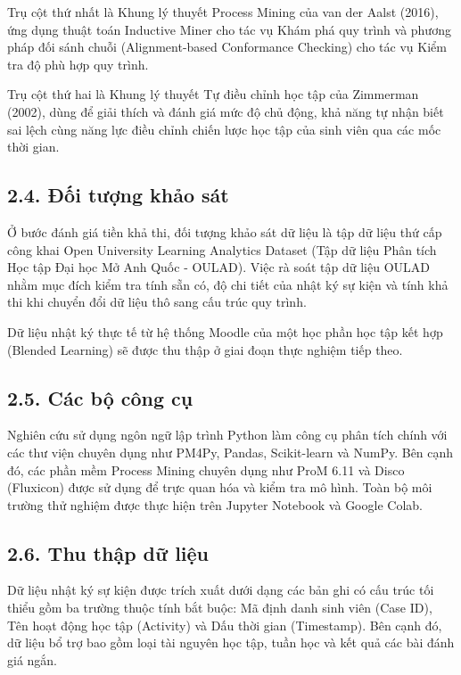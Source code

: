 Trụ cột thứ nhất là Khung lý thuyết Process Mining của van der Aalst (2016), ứng dụng thuật toán Inductive Miner cho tác vụ Khám phá quy trình và phương pháp đối sánh chuỗi (Alignment-based Conformance Checking) cho tác vụ Kiểm tra độ phù hợp quy trình.

Trụ cột thứ hai là Khung lý thuyết Tự điều chỉnh học tập của Zimmerman (2002), dùng để giải thích và đánh giá mức độ chủ động, khả năng tự nhận biết sai lệch cùng năng lực điều chỉnh chiến lược học tập của sinh viên qua các mốc thời gian.

\subsection{2.4. Đối tượng khảo sát}
Ở bước đánh giá tiền khả thi, đối tượng khảo sát dữ liệu là tập dữ liệu thứ cấp công khai Open University Learning Analytics Dataset (Tập dữ liệu Phân tích Học tập Đại học Mở Anh Quốc - OULAD). Việc rà soát tập dữ liệu OULAD nhằm mục đích kiểm tra tính sẵn có, độ chi tiết của nhật ký sự kiện và tính khả thi khi chuyển đổi dữ liệu thô sang cấu trúc quy trình.

Dữ liệu nhật ký thực tế từ hệ thống Moodle của một học phần học tập kết hợp (Blended Learning) sẽ được thu thập ở giai đoạn thực nghiệm tiếp theo.

\subsection{2.5. Các bộ công cụ}
Nghiên cứu sử dụng ngôn ngữ lập trình Python làm công cụ phân tích chính với các thư viện chuyên dụng như PM4Py, Pandas, Scikit-learn và NumPy. Bên cạnh đó, các phần mềm Process Mining chuyên dụng như ProM 6.11 và Disco (Fluxicon) được sử dụng để trực quan hóa và kiểm tra mô hình. Toàn bộ môi trường thử nghiệm được thực hiện trên Jupyter Notebook và Google Colab.

\subsection{2.6. Thu thập dữ liệu}
Dữ liệu nhật ký sự kiện được trích xuất dưới dạng các bản ghi có cấu trúc tối thiểu gồm ba trường thuộc tính bắt buộc: Mã định danh sinh viên (Case ID), Tên hoạt động học tập (Activity) và Dấu thời gian (Timestamp). Bên cạnh đó, dữ liệu bổ trợ bao gồm loại tài nguyên học tập, tuần học và kết quả các bài đánh giá ngắn.

